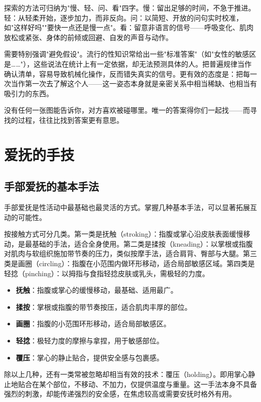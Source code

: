 \documentclass[12pt,UTF8]{ctexbook}
\newcommand{\keyword}[1]{\textbf{#1}}
\begin{document}
探索的方法可归纳为"慢、轻、问、看"四字。慢：留出足够的时间，不急于推进。轻：从轻柔开始，逐步加力，而非反向。问：以简短、开放的问句实时校准，如"这样好吗""要快一点还是慢一点"。看：留意非语言的信号——呼吸变化、肌肉放松或紧张、身体的前倾或回避、自发的声音与动作。

需要特别强调"避免假设"。流行的性知识常给出一些"标准答案"（如"女性的敏感区是……"），这些说法在统计上有一定依据，却无法预测具体的人。把普遍规律当作确认清单，容易导致机械化操作，反而错失真实的信号。更有效的态度是：把每一次当作第一次去了解这个人——这一姿态本身就是亲密关系中相当稀缺、也相当有吸引力的东西。

\begin{tcolorbox}[colback=pink!5!white,colframe=red!50!black,title=贴心小叮咛]
没有任何一张图能告诉你，对方喜欢被碰哪里。唯一的答案得你们一起找——而寻找的过程，往往比找到答案更有意思。
\end{tcolorbox}

\section{爱抚的手技}
\subsection{手部爱抚的基本手法}

手部爱抚是性活动中最基础也最灵活的方式。掌握几种基本手法，可以显著拓展互动的可能性。

按接触方式可分几类。第一类是抚触（stroking）：指腹或掌心沿皮肤表面缓慢移动，是最基础的手法，适合全身使用。第二类是揉按（kneading）：以掌根或指腹对肌肉与软组织施加带节奏的压力，类似按摩手法，适合肩背、臀部与大腿。第三类是画圈（circling）：指腹在小范围内做环形移动，适合局部敏感区域。第四类是轻捻（pinching）：以拇指与食指轻捻皮肤或乳头，需极轻的力度。

\begin{itemize}
  \item \keyword{抚触}：指腹或掌心的缓慢移动，最基础、适用最广。
  \item \keyword{揉按}：掌根或指腹的带节奏按压，适合肌肉丰厚的部位。
  \item \keyword{画圈}：指腹的小范围环形移动，适合局部敏感区。
  \item \keyword{轻捻}：极轻力度的摩擦与拿捏，用于敏感部位。
  \item \keyword{覆压}：掌心的静止贴合，提供安全感与包裹感。
\end{itemize}

除以上几种，还有一类常被忽略却相当有效的技术：覆压（holding）。即用掌心静止地贴合在某个部位，不移动、不加力，仅提供温度与重量。这一手法本身不具备强烈的刺激，却能传递强烈的安全感，在焦虑较高或需要安抚时格外有用。
\end{document}
